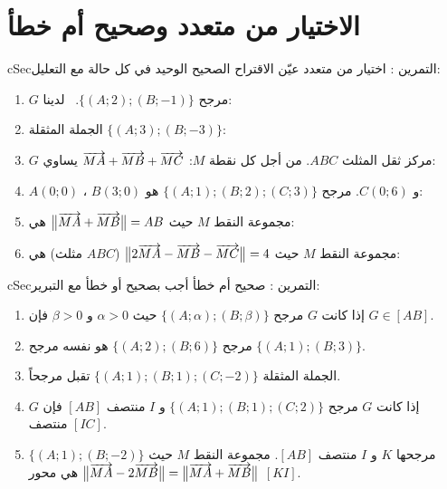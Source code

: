\documentclass[12pt,a4paper]{article}
\newenvironment{BOX}[2]{\begin{otherlanguage}{english}\begin{arbox}{#1}{#2}}{\end{arbox}\end{otherlanguage}}
\newcounter{exo}
\newenvironment{tamrin}[1]{\stepcounter{exo}\begin{BOX}{cSec}{التمرين \theexo: #1}}{\end{BOX}}
\begin{document}
\section{الاختيار من متعدد وصحيح أم خطأ}
\begin{tamrin}{اختيار من متعدد}
عيّن الاقتراح الصحيح الوحيد في كل حالة مع التعليل:
\begin{enumerate}
\item $G$ مرجح $\{(A;2);(B;-1)\}$. \ لدينا:
\item الجملة المثقلة $\{(A;3);(B;-3)\}$:
\item $G$ مركز ثقل المثلث $ABC$. من أجل كل نقطة $M$: $\overrightarrow{MA}+\overrightarrow{MB}+\overrightarrow{MC}$ يساوي:
\item $A(0;0)$ ، $B(3;0)$ و $C(0;6)$. مرجح $\{(A;1);(B;2);(C;3)\}$ هو:
\item مجموعة النقط $M$ حيث $\big\|\overrightarrow{MA}+\overrightarrow{MB}\big\|=AB$ هي:
\item مجموعة النقط $M$ حيث $\big\|2\overrightarrow{MA}-\overrightarrow{MB}-\overrightarrow{MC}\big\|=4$ ($ABC$ مثلث) هي:
\end{enumerate}
\end{tamrin}

\begin{tamrin}{صحيح أم خطأ}
أجب بصحيح أو خطأ مع التبرير:
\begin{enumerate}
\item إذا كانت $G$ مرجح $\{(A;\alpha);(B;\beta)\}$ حيث $\alpha>0$ و $\beta>0$ فإن $G\in[AB]$.
\item مرجح $\{(A;2);(B;6)\}$ هو نفسه مرجح $\{(A;1);(B;3)\}$.
\item الجملة المثقلة $\{(A;1);(B;1);(C;-2)\}$ تقبل مرجحاً.
\item إذا كانت $G$ مرجح $\{(A;1);(B;1);(C;2)\}$ و $I$ منتصف $[AB]$ فإن $G$ منتصف $[IC]$.
\item $\{(A;1);(B;-2)\}$ مرجحها $K$ و $I$ منتصف $[AB]$. مجموعة النقط $M$ حيث $\big\|\overrightarrow{MA}-2\overrightarrow{MB}\big\|=\big\|\overrightarrow{MA}+\overrightarrow{MB}\big\|$ هي محور $[KI]$.
\end{enumerate}
\end{tamrin}
\end{document}
